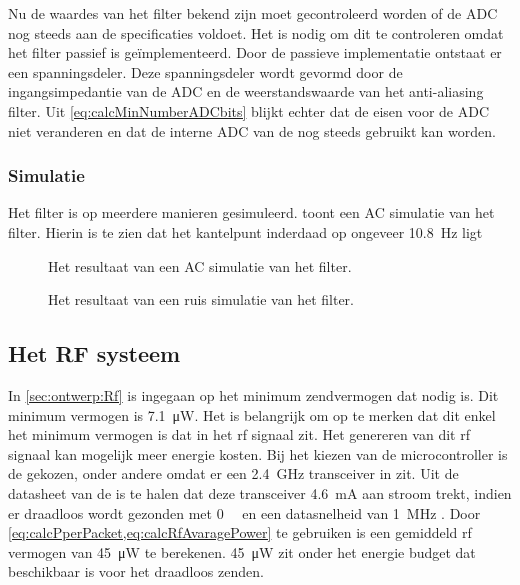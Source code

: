 Nu de waardes van het filter bekend zijn moet gecontroleerd worden of de ADC nog steeds aan de specificaties voldoet. Het is nodig om dit te controleren omdat het filter passief is geïmplementeerd. Door de passieve implementatie ontstaat er een spanningsdeler. Deze spanningsdeler wordt gevormd door de ingangsimpedantie van de ADC en de weerstandswaarde van het anti-aliasing filter. Uit \cref{eq:calcMinNumberADCbits} blijkt echter dat de eisen voor de ADC niet veranderen en dat de interne ADC van de \mcu nog steeds gebruikt kan worden.


\subsubsection{Simulatie}
Het filter is op meerdere manieren gesimuleerd.  toont een AC simulatie van het filter. Hierin is te zien dat het kantelpunt inderdaad op ongeveer \qty{10.8}{\hertz} ligt

\begin{figure}[!htbp]
    \centering
    \pgfplotsset{width=0.7\textwidth}
    
    \caption{Het resultaat van een AC simulatie van het filter.}
    \label{fig:filterSimFreq}
\end{figure}

\begin{figure}[!htbp]
    \centering
    \pgfplotsset{width=0.7\textwidth}
    
    \caption{Het resultaat van een ruis simulatie van het filter.}
    \label{fig:filterSimNoise}
\end{figure}


\subsection{Het RF systeem}
In \cref{sec:ontwerp:Rf} is ingegaan op het minimum zendvermogen dat nodig is. Dit minimum vermogen is \qty{7.1}{\micro\watt}. Het is belangrijk om op te merken dat dit enkel het minimum vermogen is dat in het rf signaal zit. Het genereren van dit rf signaal kan mogelijk meer energie kosten. Bij het kiezen van de microcontroller is de \mcu gekozen, onder andere omdat er een \qty{2.4}{\giga\hertz} transceiver in zit. Uit de datasheet van de \mcu is te halen dat deze transceiver \qty{4.6}{\milli\ampere} aan stroom trekt, indien er draadloos wordt gezonden met \qty{0}{\deci\belmilliwatt} en een datasnelheid van \qty{1}{\mega\hertz} \cite{nrf52810}. Door \cref{eq:calcPperPacket,eq:calcRfAvaragePower} te gebruiken is een gemiddeld rf vermogen van \qty{45}{\micro\watt} te berekenen. \qty{45}{\micro\watt} zit onder het energie budget dat beschikbaar is voor het draadloos zenden.

